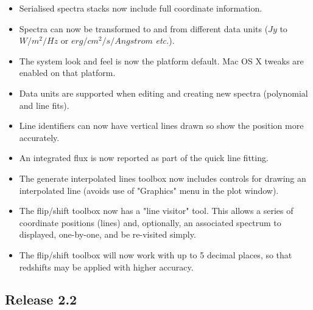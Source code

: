 \documentclass[twoside,11pt]{article}
\renewcommand{\_}{\texttt{\symbol{95}}}
\newcommand{\etc}{\textit{etc.}}
\begin{document}
\begin{itemize}
\item Serialised spectra stacks now include full coordinate information.

\item Spectra can now be transformed to and from different data units
      ($Jy$ to $W/m^{2}/Hz$ or $erg/cm^{2}/s/Angstrom$ \etc).

\item The system look and feel is now the platform default. Mac OS X tweaks
      are enabled on that platform.

\item Data units are supported when editing and creating new spectra
     (polynomial and line fits).

\item Line identifiers can now have vertical lines drawn so show the 
      position more accurately. 

\item An integrated flux is now reported as part of the quick line fitting.

\item The generate interpolated lines toolbox now includes controls for
      drawing an interpolated line (avoids use of "Graphics" menu in 
      the plot window).

\item The flip/shift toolbox now has a "line visitor" tool. This allows a
      series of coordinate positions (lines) and, optionally, an associated
      spectrum to displayed, one-by-one, and be re-visited simply.

\item The flip/shift toolbox will now work with up to 5 decimal places, so 
      that redshifts may be applied with higher accuracy.

\end{itemize}


\subsection{Release 2.2}
\end{document}
